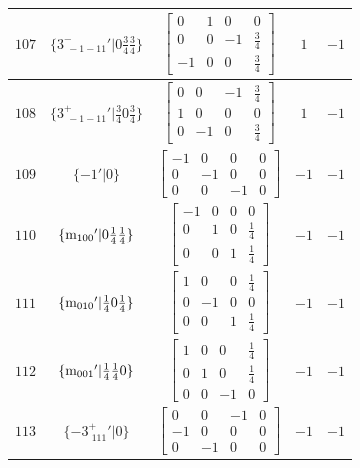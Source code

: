 \documentclass[fleqn,8pt]{jsarticle}
\begin{document}
\begin{longtable}{ccccc}
$ 107 $ & $ \{3^{-}_{\,\,-1-11}{}'|0 \frac{3}{4} \frac{3}{4}\} $ & $ \begin{bmatrix} 0 & 1 & 0 & 0 \\ 0 & 0 & -1 & \frac{3}{4} \\ -1 & 0 & 0 & \frac{3}{4} \end{bmatrix} $ & $ 1 $ & $ -1 $ \\ \hline
$ 108 $ & $ \{3^{+}_{\,\,-1-11}{}'|\frac{3}{4} 0 \frac{3}{4}\} $ & $ \begin{bmatrix} 0 & 0 & -1 & \frac{3}{4} \\ 1 & 0 & 0 & 0 \\ 0 & -1 & 0 & \frac{3}{4} \end{bmatrix} $ & $ 1 $ & $ -1 $ \\ \hline
$ 109 $ & $ \{-1{}'|0\} $ & $ \begin{bmatrix} -1 & 0 & 0 & 0 \\ 0 & -1 & 0 & 0 \\ 0 & 0 & -1 & 0 \end{bmatrix} $ & $ -1 $ & $ -1 $ \\ \hline
$ 110 $ & $ \{{\rm m}_{100}{}'|0 \frac{1}{4} \frac{1}{4}\} $ & $ \begin{bmatrix} -1 & 0 & 0 & 0 \\ 0 & 1 & 0 & \frac{1}{4} \\ 0 & 0 & 1 & \frac{1}{4} \end{bmatrix} $ & $ -1 $ & $ -1 $ \\ \hline
$ 111 $ & $ \{{\rm m}_{010}{}'|\frac{1}{4} 0 \frac{1}{4}\} $ & $ \begin{bmatrix} 1 & 0 & 0 & \frac{1}{4} \\ 0 & -1 & 0 & 0 \\ 0 & 0 & 1 & \frac{1}{4} \end{bmatrix} $ & $ -1 $ & $ -1 $ \\ \hline
$ 112 $ & $ \{{\rm m}_{001}{}'|\frac{1}{4} \frac{1}{4} 0\} $ & $ \begin{bmatrix} 1 & 0 & 0 & \frac{1}{4} \\ 0 & 1 & 0 & \frac{1}{4} \\ 0 & 0 & -1 & 0 \end{bmatrix} $ & $ -1 $ & $ -1 $ \\ \hline
$ 113 $ & $ \{-3^{+}_{\,\,111}{}'|0\} $ & $ \begin{bmatrix} 0 & 0 & -1 & 0 \\ -1 & 0 & 0 & 0 \\ 0 & -1 & 0 & 0 \end{bmatrix} $ & $ -1 $ & $ -1 $ \\ \hline

\end{longtable}
\end{document}
